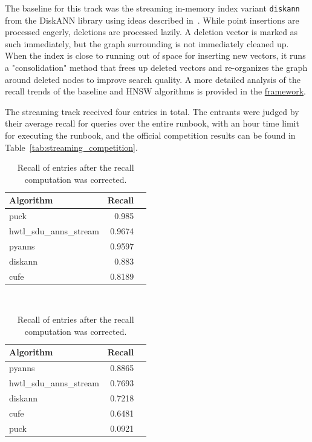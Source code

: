 The baseline for this track was the streaming in-memory index variant \texttt{diskann} from the DiskANN library\cite{Diskann-v0.5} using ideas described in~\cite{FreshDiskaNN}.
%
%
While point insertions are processed eagerly, deletions are processed lazily. 
% 
A deletion vector is marked as such immediately, but the graph surrounding is not immediately cleaned up.
%
%
When the index is close to running out of space for inserting new vectors, it runs a "consolidation" method
that frees up deleted vectors and re-organizes the graph around deleted nodes to improve search quality.
%
%
A more detailed analysis of the recall trends of the baseline and HNSW algorithms is provided in the \href{https://github.com/harsha-simhadri/big-ann-benchmarks/blob/v0.3/neurips23/notes/streaming/hnsw\_result/hnsw\_result.md}{framework}.

The streaming track received four entries in total.
%
The entrants were judged by their average recall for queries over the entire runbook, with an hour time limit for executing the runbook, and the official competition results can be found in Table~\ref{tab:streaming_competition}. 

\begin{table}[ht]
\small
\begin{minipage}{0.38\textwidth}
\begin{tabular}{lrr}
\hline
Algorithm & Recall \\
\hline
puck &  0.985\\
hwtl\_sdu\_anns\_stream &  0.9674\\
pyanns &  0.9597 \\
diskann & 0.883 \\
cufe & 0.8189 \\ 
\hline
\end{tabular}
\caption{Recall reported for entries in the official results for the streaming track.}\label{tab:streaming_competition}
\end{minipage}\centering
~~~~~~~~
\begin{minipage}{0.38\textwidth}
\centering
\begin{tabular}{lrr}
\hline
Algorithm & Recall \\
\hline
pyanns & 0.8865 \\
hwtl\_sdu\_anns\_stream & 0.7693 \\
diskann & 0.7218 \\
cufe & 0.6481  \\
puck & 0.0921 \\ 
\hline
\end{tabular}
\caption{Recall of entries after the recall computation was corrected.}\label{tab:streaming_actual}
\end{minipage}
\end{table}

